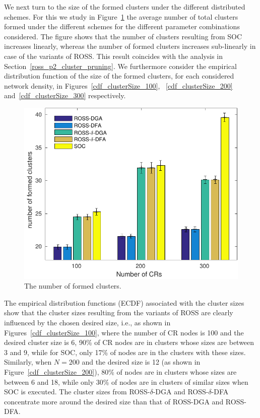 \documentclass[times]{ettauth}
\newcommand{\ie}{i.e., }
\theoremstyle{mytheoremstyle}
\theoremstyle{mytheoremstyle}
\theoremstyle{mytheoremstyle}
\begin{document}
We next turn to the size of the formed clusters under the different distributed schemes.
For this we study in Figure~\ref{nClusters_largeNetwork} the average number of total clusters formed under the different schemes for the different parameter combinations considered.
The figure shows that the number of clusters resulting from SOC increases linearly, whereas the number of formed clusters increases sub-linearly in case of the variants of ROSS.
This result coincides with the analysis in Section~\ref{ross_p2_cluster_pruning}.
We furthermore consider the empirical distribution function of the size of the formed clusters, for each considered network density, in Figures~\ref{cdf_clusterSize_100}, ~\ref{cdf_clusterSize_200} and~\ref{cdf_clusterSize_300} respectively.
\begin{figure}[!h]
  \centering
   \includegraphics[width=0.7\linewidth]{nClusters_largeNetwork_no_texture.pdf}
  \caption{The number of formed clusters.}
  \label{nClusters_largeNetwork}
\end{figure}

The empirical distribution functions (ECDF) associated with the cluster sizes show that the cluster sizes resulting from the variants of ROSS are clearly influenced by the chosen desired size, \ie as shown in Figures~\ref{cdf_clusterSize_100}, where the number of CR nodes is 100 and the desired cluster size is 6, 90\% of CR nodes are in clusters whose sizes are between 3 and 9, while for SOC, only 17\% of nodes are in the clusters with these sizes.
Similarly, when $N=200$ and the desired size is 12 (as shown in Figure~\ref{cdf_clusterSize_200}), 80\% of nodes are in clusters whose sizes are between 6 and 18, while only 30\% of nodes are in clusters of similar sizes when SOC is executed.
The cluster sizes from ROSS-$\delta$-DGA and ROSS-$\delta$-DFA concentrate more around the desired size than that of ROSS-DGA and ROSS-DFA.
\end{document}
